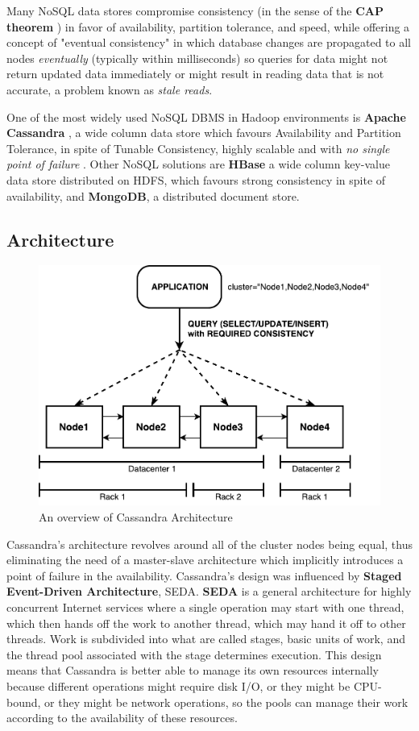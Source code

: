 Many NoSQL data stores compromise consistency (in the sense of the \textbf{CAP theorem} \cite{Gilbert:2002:BCF:564585.564601}) in favor of availability, partition tolerance, and speed, while offering a concept of "eventual consistency" in which database changes are propagated to all nodes \textit{eventually} (typically within milliseconds) so queries for data might not return updated data immediately or might result in reading data that is not accurate, a problem known as \textit{stale reads}.

One of the most widely used NoSQL DBMS in Hadoop environments is \textbf{Apache Cassandra} \cite{CassandraDefinitive}, a wide column data store which favours Availability and Partition Tolerance, in spite of Tunable Consistency, highly scalable and with \textit{no single point of failure} \cite{Lakshman:2010:CDS:1773912.1773922}. Other NoSQL solutions are \textbf{HBase} a wide column key-value data store distributed on HDFS, which favours strong consistency in spite of availability, and \textbf{MongoDB}, a distributed document store.

\subsection{Architecture}

\begin{figure}[h]
    \centering
    \includegraphics[width=0.7\linewidth]{Figures/cassandra_arch}
    \caption{An overview of Cassandra Architecture}
    \label{fig:cassandraarch}
\end{figure}


Cassandra's architecture revolves around all of the cluster nodes being equal, thus eliminating the need of a master-slave architecture which implicitly introduces a point of failure in the availability. Cassandra’s design was influenced by \textbf{Staged Event-Driven Architecture}, SEDA. \textbf{SEDA} is a general architecture for highly concurrent Internet services \cite{Welsh:2001:SAW:502059.502057} where a single operation may start with one thread, which then hands off the work to another thread, which may hand it off to other threads. Work is subdivided into what are called stages, basic units of work, and the thread pool associated with the stage determines execution. This design means that Cassandra is better able to manage its own resources internally because different operations might require disk I/O, or they might be CPU-bound, or they might be network operations, so the pools can manage their work according to the availability of these resources.

